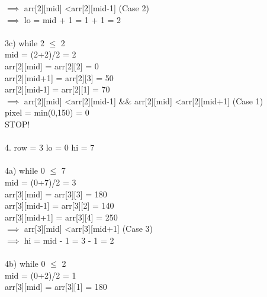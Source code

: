 \documentclass[10pt]{article}
\begin{document}
\begin{multicols*}{2}
        $\implies$ arr[2][mid] \textless arr[2][mid-1] (Case 2)\\
        
        $\implies$ lo = mid + 1 = 1 + 1 = 2\\\\3c) while 2 $\leq$ 2\\
    
        mid = (2+2)/2 = 2\\

        arr[2][mid] = arr[2][2] = 0\\

        arr[2][mid+1] = arr[2][3] = 50\\
        
        arr[2][mid-1] = arr[2][1] = 70\\
        
        $\implies$ arr[2][mid] \textless arr[2][mid-1] \&\& arr[2][mid] \textless arr[2][mid+1] (Case 1)\\
    
        pixel = min(0,150) = 0\\ 
        
        STOP!\\\\4. row = 3
   lo = 0
   hi = 7 \\\\4a) while 0 $\leq$ 7\\

        mid = (0+7)/2 = 3\\

        arr[3][mid] = arr[3][3] = 180\\

        arr[3][mid-1] = arr[3][2] = 140\\

        arr[3][mid+1] = arr[3][4] = 250\\
        
        $\implies$ arr[3][mid] \textless arr[3][mid+1] (Case 3)\\
        
        $\implies$ hi = mid - 1 = 3 - 1 = 2\\\\4b) while 0 $\leq$ 2\\
    
        mid = (0+2)/2 = 1\\

        arr[3][mid] = arr[3][1] = 180\\


\end{multicols*}
\end{document}
